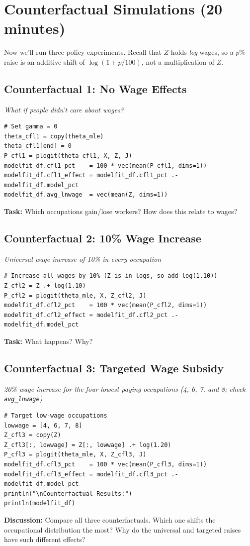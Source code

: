 \documentclass[12pt,english]{article}
\begin{document}
\section{Counterfactual Simulations (20 minutes)}
Now we'll run three policy experiments. Recall that $Z$ holds \emph{log} wages, so a $p$\% raise is an additive shift of $\log(1+p/100)$, not a multiplication of $Z$.
\subsection{Counterfactual 1: No Wage Effects}
\textit{What if people didn't care about wages?}
\begin{verbatim}
# Set gamma = 0
theta_cfl1 = copy(theta_mle)
theta_cfl1[end] = 0
P_cfl1 = plogit(theta_cfl1, X, Z, J)
modelfit_df.cfl1_pct    = 100 * vec(mean(P_cfl1, dims=1))
modelfit_df.cfl1_effect = modelfit_df.cfl1_pct .- modelfit_df.model_pct
modelfit_df.avg_lnwage  = vec(mean(Z, dims=1))
\end{verbatim}
\textbf{Task:} Which occupations gain/lose workers? How does this relate to wages?
\subsection{Counterfactual 2: 10\% Wage Increase}
\textit{Universal wage increase of 10\% in every occupation}
\begin{verbatim}
# Increase all wages by 10% (Z is in logs, so add log(1.10))
Z_cfl2 = Z .+ log(1.10)
P_cfl2 = plogit(theta_mle, X, Z_cfl2, J)
modelfit_df.cfl2_pct    = 100 * vec(mean(P_cfl2, dims=1))
modelfit_df.cfl2_effect = modelfit_df.cfl2_pct .- modelfit_df.model_pct
\end{verbatim}
\textbf{Task:} What happens? Why?
\subsection{Counterfactual 3: Targeted Wage Subsidy}
\textit{20\% wage increase for the four lowest-paying occupations (4, 6, 7, and 8; check \texttt{avg\_lnwage})}
\begin{verbatim}
# Target low-wage occupations
lowwage = [4, 6, 7, 8]
Z_cfl3 = copy(Z)
Z_cfl3[:, lowwage] = Z[:, lowwage] .+ log(1.20)
P_cfl3 = plogit(theta_mle, X, Z_cfl3, J)
modelfit_df.cfl3_pct    = 100 * vec(mean(P_cfl3, dims=1))
modelfit_df.cfl3_effect = modelfit_df.cfl3_pct .- modelfit_df.model_pct
println("\nCounterfactual Results:")
println(modelfit_df)
\end{verbatim}
\textbf{Discussion:} Compare all three counterfactuals. Which one shifts the occupational distribution the most? Why do the universal and targeted raises have such different effects?
\end{document}
